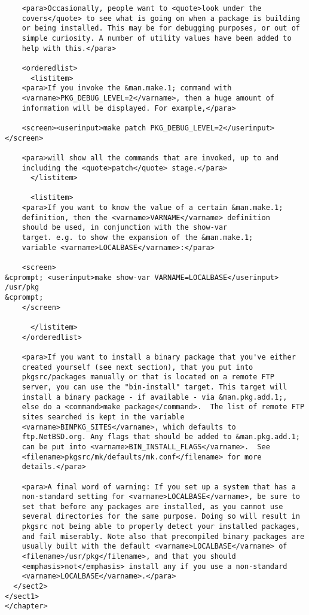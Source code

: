 \begin{verbatim}
    <para>Occasionally, people want to <quote>look under the
    covers</quote> to see what is going on when a package is building
    or being installed. This may be for debugging purposes, or out of
    simple curiosity. A number of utility values have been added to
    help with this.</para>

    <orderedlist>
      <listitem>
	<para>If you invoke the &man.make.1; command with
	<varname>PKG_DEBUG_LEVEL=2</varname>, then a huge amount of
	information will be displayed. For example,</para>

	<screen><userinput>make patch PKG_DEBUG_LEVEL=2</userinput></screen>

	<para>will show all the commands that are invoked, up to and
	including the <quote>patch</quote> stage.</para>
      </listitem>

      <listitem>
	<para>If you want to know the value of a certain &man.make.1;
	definition, then the <varname>VARNAME</varname> definition
	should be used, in conjunction with the show-var
	target. e.g. to show the expansion of the &man.make.1;
	variable <varname>LOCALBASE</varname>:</para>

	<screen>
&cprompt; <userinput>make show-var VARNAME=LOCALBASE</userinput>
/usr/pkg
&cprompt;
	</screen>

      </listitem>
    </orderedlist>

    <para>If you want to install a binary package that you've either
    created yourself (see next section), that you put into
    pkgsrc/packages manually or that is located on a remote FTP
    server, you can use the "bin-install" target. This target will
    install a binary package - if available - via &man.pkg.add.1;,
    else do a <command>make package</command>.  The list of remote FTP
    sites searched is kept in the variable
    <varname>BINPKG_SITES</varname>, which defaults to
    ftp.NetBSD.org. Any flags that should be added to &man.pkg.add.1;
    can be put into <varname>BIN_INSTALL_FLAGS</varname>.  See
    <filename>pkgsrc/mk/defaults/mk.conf</filename> for more
    details.</para>

    <para>A final word of warning: If you set up a system that has a
    non-standard setting for <varname>LOCALBASE</varname>, be sure to
    set that before any packages are installed, as you cannot use
    several directories for the same purpose. Doing so will result in
    pkgsrc not being able to properly detect your installed packages,
    and fail miserably. Note also that precompiled binary packages are
    usually built with the default <varname>LOCALBASE</varname> of
    <filename>/usr/pkg</filename>, and that you should
    <emphasis>not</emphasis> install any if you use a non-standard
    <varname>LOCALBASE</varname>.</para>
  </sect2>
</sect1>
</chapter>
\end{verbatim}


